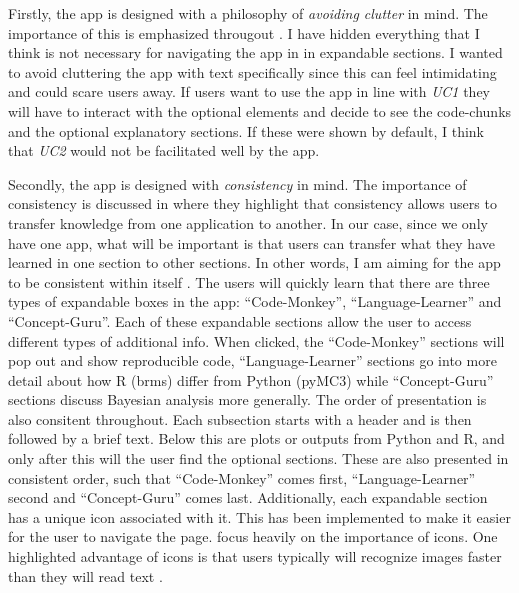 \documentclass[12pt]{article}
\begin{document}
\vspace{5mm}

Firstly, the app is designed with a philosophy of \emph{avoiding clutter} in mind.
The importance of this is emphasized througout \textcite{mills1992macintosh}.
I have hidden everything that I think is not necessary for navigating the app
in in expandable sections. I wanted to avoid cluttering the
app with text specifically since this can feel intimidating and could scare users away.
If users want to use the app in line with \emph{UC1} they will have to interact with the optional
elements and decide to see the code-chunks and the optional explanatory sections.
If these were shown by default, I think that \emph{UC2} would not be facilitated well by the app.

\vspace{5mm}

Secondly, the app is designed with \emph{consistency} in mind.
The importance of consistency is discussed in
\textcite[7]{mills1992macintosh}
where they highlight that consistency allows users to transfer knowledge from one
application to another. In our case, since we only have one app, what will be important is
that users can transfer what they have learned in one section to other sections.
In other words, I am aiming for the app to be consistent within itself
\autocite[8]{mills1992macintosh}.
The users will quickly learn that there are three types of expandable boxes in the app:
“Code-Monkey”, “Language-Learner” and “Concept-Guru”. Each of these expandable sections
allow the user to access different types of additional info. When clicked, the “Code-Monkey”
sections will pop out and show reproducible code, “Language-Learner” sections go into more detail
about how R (brms) differ from Python (pyMC3) while “Concept-Guru” sections discuss Bayesian analysis
more generally. The order of presentation is also consitent throughout.
Each subsection starts with a header and is then followed by a brief text.
Below this are plots or outputs from Python and R, and only after this will the user find
the optional sections. These are also presented in consistent order, such that “Code-Monkey” comes first,
“Language-Learner” second and “Concept-Guru” comes last. Additionally, each expandable section
has a unique icon associated with it. This has been implemented to make it easier for the
user to navigate the page. \textcite[223-255]{mills1992macintosh} focus
heavily on the importance of icons. One highlighted advantage of icons is that users typically
will recognize images faster than they will read text
\autocite[244]{mills1992macintosh}.
\end{document}
